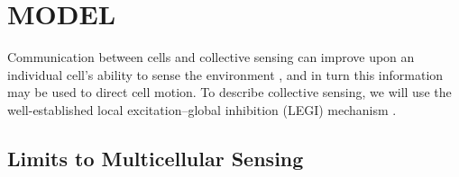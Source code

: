 \section{MODEL}

Communication between cells and collective sensing can improve upon an individual cell's ability to sense the environment \cite{ellison2016cell}, and in turn this information may be used to direct cell motion. To describe collective sensing, we will use the well-established local excitation--global inhibition (LEGI) mechanism \cite{mugler2016limits,levchenko2002models}.

\subsection{Limits to Multicellular Sensing}

